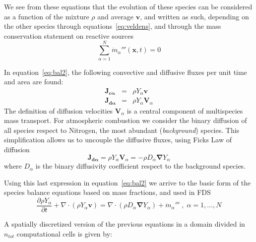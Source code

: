\documentclass[12pt]{article}
\begin{document}
We see from these equations that the evolution of these species can be considered as a function of the mixture $\rho$ and average $\mathbf{v}$, and written as such, depending on the other species through equations~\eqref{eq:veldens}, and through the mass conservation statement on reactive sources
%
\begin{equation}
  \sum\limits_{\alpha=1}^{N} \dot{m}_\alpha'''(\mathbf{x},t) = 0
\end{equation}
%  

In equation~\eqref{eq:bal2}, the following convective and diffusive fluxes per unit time and area are found:
%
\begin{eqnarray}
  \mathbf{J_{c \alpha}} &=& \rho Y_\alpha  \mathbf{v} \label{eq:jc} \\
  \mathbf{J_{d \alpha}} &=& \rho Y_\alpha  \mathbf{V}_\alpha \label{eq:jd}
\end{eqnarray} 
%
The definition of diffusion velocities $\mathbf{V}_\alpha$ is a central component of multispecies mass transport. For atmospheric combustion we consider the binary diffusion of all species respect to Nitrogen, the most abundant (\textit{background}) species. This simplification allows us to uncouple the diffusive fluxes, using Ficks Law of diffusion
%
\begin{equation}
   \mathbf{J_{d \alpha}} = \rho Y_\alpha  \mathbf{V}_\alpha = - \rho D_\alpha \boldsymbol{\nabla} Y_\alpha \label{eq:fick}
\end{equation}
%
where $D_\alpha$ is the binary diffusivity coefficient respect to the background species.

Using this last expression in equation~\eqref{eq:bal2} we arrive to the basic form of the species balance equations based on mass fractions, and used in FDS
%
\begin{equation}
   \frac{\partial \rho Y_\alpha}{ \partial t} + \nabla \cdot ( \rho Y_\alpha  \mathbf{v} ) = \nabla \cdot ( \rho D_\alpha \boldsymbol{\nabla} Y_\alpha ) + \dot{m}_\alpha''' \; , \; \alpha=1,\dots,N \label{eq:bal3}
\end{equation}
%

A spatially discretized version of the previous equations in a domain divided in $n_{tot}$ computational cells is given by:
\end{document}
